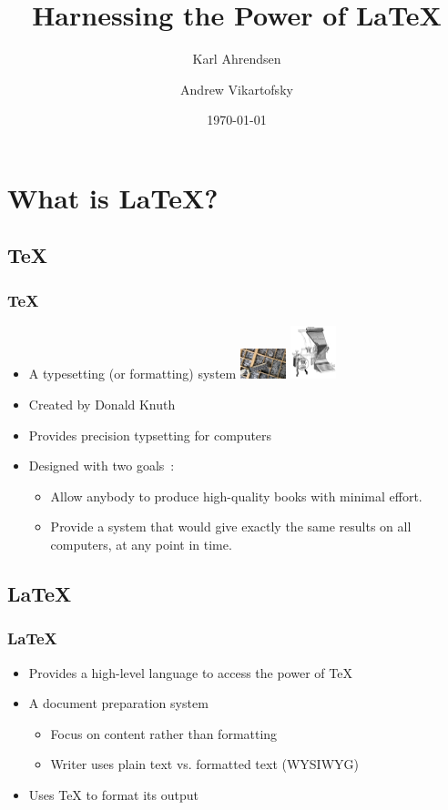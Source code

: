 \documentclass{beamer}
\title{Harnessing the Power of \LaTeX}
\author{Karl Ahrendsen \and Andrew Vikartofsky}
\institute{University of Nebraska-Lincoln}
\date{\today}
\begin{document}
\begin{frame}
	\titlepage
\end{frame}

\section{What is \LaTeX?}
\subsection{\TeX}
\begin{frame}
	\frametitle{\TeX}
    \begin{itemize}
        \item A typesetting (or formatting) system
				\includegraphics[width=50px]{img/metalWords.jpg}
				\includegraphics[width=50px]{img/typesettingMachine.png}
        \item Created by Donald Knuth
        \item Provides precision typsetting for computers
		\item Designed with two goals~\cite{wikiTex}:
            \begin{itemize}
                \item Allow anybody to produce high-quality books with minimal effort.
                \item Provide a system that would give exactly the same results on all computers, at any point in time.
			\end{itemize}
    \end{itemize}
\end{frame}
\subsection{\LaTeX}
\begin{frame}
    \frametitle{\LaTeX}
    \begin{itemize}
        \item Provides a high-level language to access the power of TeX
        \item A document preparation system
			\begin{itemize}
				\item Focus on content rather than formatting
				\item Writer uses plain text vs. formatted text (WYSIWYG)
			\end{itemize}
        \item Uses TeX to format its output
    \end{itemize}
\end{frame}
\end{document}
